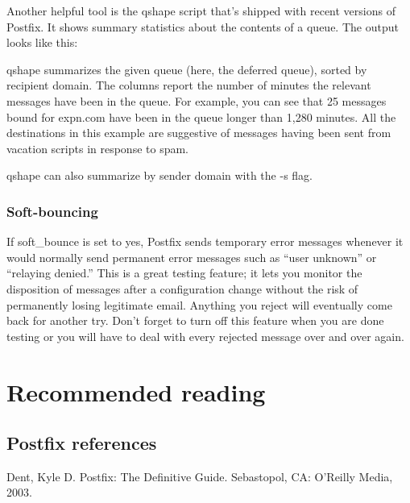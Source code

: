 Another helpful tool is the {qshape} script that's shipped with recent
versions of Postfix. It shows summary statistics about the contents of a
queue. The output looks like this:


{\protect\hypertarget{part0026_split_064.htmlux5cux23_idIndexMarker2741}{}{}}{qshape}
summarizes the given queue (here, the deferred queue), sorted by
recipient domain. The columns report the number of minutes the relevant
messages have been in the queue. For example, you can see that 25
messages bound for expn.com have been in the queue longer than 1,280
minutes. All the destinations in this example are suggestive of messages
having been sent from vacation scripts in response to spam.

{qshape} can also summarize by sender domain with the {-s} flag.



\subsubsection[Soft-bouncing]{\texorpdfstring{\protect\hypertarget{part0026_split_064.htmlux5cux23_idTextAnchor1197}{}{}Soft-bouncing}{Soft-bouncing}}

\protect\hypertarget{part0026_split_064.htmlux5cux23_idIndexMarker2742}{}{}If
\protect\hypertarget{part0026_split_064.htmlux5cux23_idIndexMarker2743}{}{}{soft\_bounce}
is set to {yes}, Postfix sends temporary error messages whenever it
would normally send permanent error messages such as ``user unknown'' or
``relaying denied.'' This is a great testing feature; it lets you
monitor the disposition of messages after a configuration change without
the risk of permanently losing legitimate email. Anything you reject
will eventually come back for another try. Don't forget to turn off this
feature when you are done testing or you will have to deal with every
rejected message over and over again.



\section{Recommended reading}

\subsection{Postfix references}

{Dent, Kyle D}. {Postfix: The Definitive Guide}. Sebastopol, CA: O'Reilly Media, 2003.

